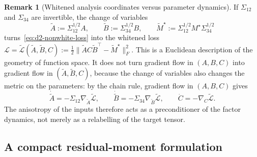 \documentclass[11pt]{article}
\newcommand{\norm}[1]{\lVert #1\rVert}
\theoremstyle{definition}
\newtheorem{remark}[theorem]{Remark}
\numberwithin{equation}{section}
\begin{document}
\begin{remark}[Whitened analysis coordinates versus parameter dynamics]\label{rem:d2-whitened-coordinates}
If $\Sigma_{12}$ and $\Sigma_{34}$ are invertible, the change of variables
\[
\widetilde A:=\Sigma_{12}^{1/2}A,\qquad\widetilde B:=\Sigma_{34}^{1/2}B,\qquad\widetilde M^\star:=\Sigma_{12}^{1/2}M^\star\Sigma_{34}^{1/2}
\]
turns~\eqref{eq:d2-nonwhite-loss} into the whitened loss $\mathcal L=\widetilde{\mathcal L}(\widetilde A,\widetilde B,C):=\frac12\norm{\widetilde AC\widetilde B^\top-\widetilde M^\star}_F^2$. This is a Euclidean description of the geometry of function space. It does not turn gradient flow in $(A,B,C)$ into gradient flow in $(\widetilde A,\widetilde B,C)$, because the change of variables also changes the metric on the parameters: by the chain rule, gradient flow in $(A,B,C)$ gives
\[
\dot{\widetilde A}=-\Sigma_{12}\nabla_{\widetilde A}\widetilde{\mathcal L},\qquad\dot{\widetilde B}=-\Sigma_{34}\nabla_{\widetilde B}\widetilde{\mathcal L},\qquad\dot C=-\nabla_C\widetilde{\mathcal L}.
\]
The anisotropy of the inputs therefore acts as a preconditioner of the factor dynamics, not merely as a relabelling of the target tensor.
\end{remark}

\subsection{A compact residual-moment formulation}\label{sec:d2-compact}
\end{document}
